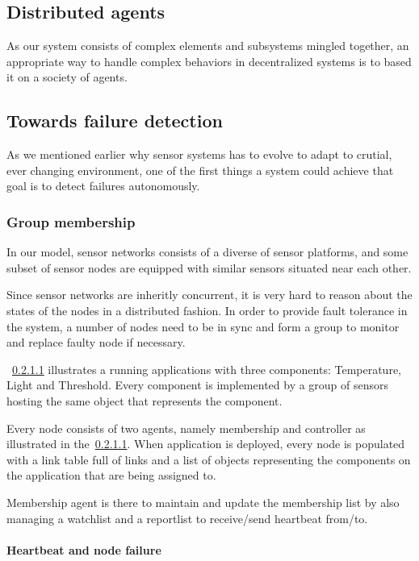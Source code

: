 \subsection{Distributed agents}

As our system consists of complex elements and subsystems mingled together, an
appropriate way to handle complex behaviors in decentralized systems is to
based it on a society of agents.~\cite{Minar1999}

\subsection{Towards failure detection}

As we mentioned earlier why sensor systems has to evolve to adapt to crutial,
ever changing environment, one of the first things a system could achieve that
goal is to detect failures autonomously.

\subsubsection{Group membership}

In our model, sensor networks consists of a diverse of sensor platforms, and some
subset of sensor nodes are equipped with similar sensors situated near each other.

Since sensor networks are inheritly concurrent, it is very hard to reason about
the states of the nodes in a distributed fashion. In order to provide fault
tolerance in the system, a number of nodes need to be in sync and form a group
to monitor and replace faulty node if necessary.

~\ref{} illustrates a running applications with three components: Temperature,
Light and Threshold. Every component is implemented by a group of sensors
hosting the same object that represents the component.

Every node consists of two agents, namely membership and controller as
illustrated in the~\ref{}. When application is deployed, every node is populated with a link table full of links and a list of objects representing the components on the application that are being assigned to.

Membership agent is there to maintain and update the membership list by
also managing a watchlist and a reportlist to receive/send heartbeat from/to.

\paragraph{Heartbeat and node failure}

